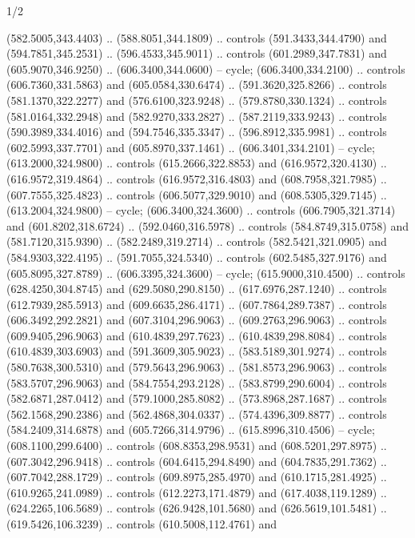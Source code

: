 \begin{flagdescription}{1/2}
\begin{scope}[shift={(2*\flaglength/3-0.25*\rb,0.51333\flagwidth)},scale=0.001715\flagwidth*\stretchfactor]
\begin{scope}[y=-1pt, x=1pt,cm={{1.04354,0.0,0.0,1.01818,(-827,-297)}}]
\begin{scope}[draw=black,line width=0.015\flagwidth]
\begin{scope}[fill=gold]
  (582.5005,343.4403) .. (588.8051,344.1809) .. controls (591.3433,344.4790) and
  (594.7851,345.2531) .. (596.4533,345.9011) .. controls (601.2989,347.7831) and
  (605.9070,346.9250) .. (606.3400,344.0600) -- cycle;
 (606.3400,334.2100) .. controls (606.7360,331.5863) and
  (605.0584,330.6474) .. (591.3620,325.8266) .. controls (581.1370,322.2277) and
  (576.6100,323.9248) .. (579.8780,330.1324) .. controls (581.0164,332.2948) and
  (582.9270,333.2827) .. (587.2119,333.9243) .. controls (590.3989,334.4016) and
  (594.7546,335.3347) .. (596.8912,335.9981) .. controls (602.5993,337.7701) and
  (605.8970,337.1461) .. (606.3401,334.2101) -- cycle;
 (613.2000,324.9800) .. controls (615.2666,322.8853) and
  (616.9572,320.4130) .. (616.9572,319.4864) .. controls (616.9572,316.4803) and
  (608.7958,321.7985) .. (607.7555,325.4823) .. controls (606.5077,329.9010) and
  (608.5305,329.7145) .. (613.2004,324.9800) -- cycle;
 (606.3400,324.3600) .. controls (606.7905,321.3714) and
  (601.8202,318.6724) .. (592.0460,316.5978) .. controls (584.8749,315.0758) and
  (581.7120,315.9390) .. (582.2489,319.2714) .. controls (582.5421,321.0905) and
  (584.9303,322.4195) .. (591.7055,324.5340) .. controls (602.5485,327.9176) and
  (605.8095,327.8789) .. (606.3395,324.3600) -- cycle;
 (615.9000,310.4500) .. controls (628.4250,304.8745) and
  (629.5080,290.8150) .. (617.6976,287.1240) .. controls (612.7939,285.5913) and
  (609.6635,286.4171) .. (607.7864,289.7387) .. controls (606.3492,292.2821) and
  (607.3104,296.9063) .. (609.2763,296.9063) .. controls (609.9405,296.9063) and
  (610.4839,297.7623) .. (610.4839,298.8084) .. controls (610.4839,303.6903) and
  (591.3609,305.9023) .. (583.5189,301.9274) .. controls (580.7638,300.5310) and
  (579.5643,296.9063) .. (581.8573,296.9063) .. controls (583.5707,296.9063) and
  (584.7554,293.2128) .. (583.8799,290.6004) .. controls (582.6871,287.0412) and
  (579.1000,285.8082) .. (573.8968,287.1687) .. controls (562.1568,290.2386) and
  (562.4868,304.0337) .. (574.4396,309.8877) .. controls (584.2409,314.6878) and
  (605.7266,314.9796) .. (615.8996,310.4506) -- cycle;
 (608.1100,299.6400) .. controls (608.8353,298.9531) and
  (608.5201,297.8975) .. (607.3042,296.9418) .. controls (604.6415,294.8490) and
  (604.7835,291.7362) .. (607.7042,288.1729) .. controls (609.8975,285.4970) and
  (610.1715,281.4925) .. (610.9265,241.0989) .. controls (612.2273,171.4879) and
  (617.4038,119.1289) .. (624.2265,106.5689) .. controls (626.9428,101.5680) and
  (626.5619,101.5481) .. (619.5426,106.3239) .. controls (610.5008,112.4761) and

\end{scope}
\end{scope}
\end{scope}
\end{scope}
\end{flagdescription}
